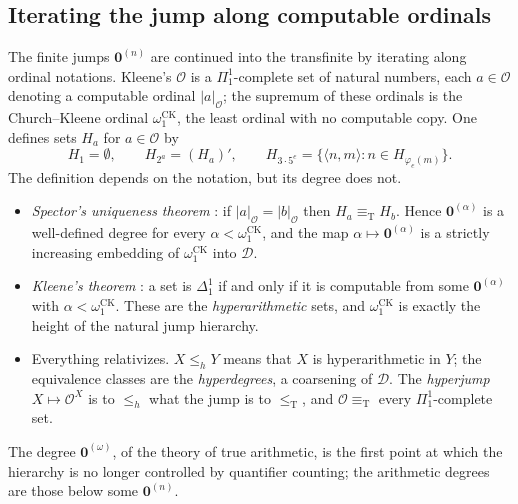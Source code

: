 \documentclass[11pt,a4paper]{article}
\newcommand{\D}{\mathcal D}
\newcommand{\leT}{\leq_{\mathrm T}}
\newcommand{\eqT}{\equiv_{\mathrm T}}
\newcommand{\zero}{\mathbf0}
\newcommand{\pair}[2]{\langle#1,#2\rangle}
\theoremstyle{definition}\newtheorem{definition}[theorem]{Definition}
\theoremstyle{remark}\newtheorem{remark}[theorem]{Remark}
\begin{document}
\subsection{Iterating the jump along computable ordinals}
\label{sec:ordinals-hyp}
The finite jumps $\zero^{(n)}$ are continued into the transfinite by iterating along ordinal notations. Kleene's $\mathcal O$ is a $\Pi^1_1$-complete set of natural numbers, each $a\in\mathcal O$ denoting a computable ordinal $|a|_{\mathcal O}$; the supremum of these ordinals is the Church--Kleene ordinal $\omega_1^{\mathrm{CK}}$, the least ordinal with no computable copy. One defines sets $H_a$ for $a\in\mathcal O$ by
\[
 H_1=\emptyset,\qquad H_{2^a}=(H_a)',\qquad
 H_{3\cdot5^e}=\{\pair{n}{m}:n\in H_{\varphi_e(m)}\}.
\]
The definition depends on the notation, but its degree does not.
\begin{itemize}
\item \emph{Spector's uniqueness theorem} \cite{Spector}: if $|a|_{\mathcal O}=|b|_{\mathcal O}$ then $H_a\eqT H_b$. Hence $\zero^{(\alpha)}$ is a well-defined degree for every $\alpha<\omega_1^{\mathrm{CK}}$, and the map $\alpha\mapsto\zero^{(\alpha)}$ is a strictly increasing embedding of $\omega_1^{\mathrm{CK}}$ into $\D$.
\item \emph{Kleene's theorem} \cite{Kleene}: a set is $\Delta^1_1$ if and only if it is computable from some $\zero^{(\alpha)}$ with $\alpha<\omega_1^{\mathrm{CK}}$. These are the \emph{hyperarithmetic} sets, and $\omega_1^{\mathrm{CK}}$ is exactly the height of the natural jump hierarchy.
\item Everything relativizes. $X\le_h Y$ means that $X$ is hyperarithmetic in $Y$; the equivalence classes are the \emph{hyperdegrees}, a coarsening of $\D$. The \emph{hyperjump} $X\mapsto\mathcal O^X$ is to $\le_h$ what the jump is to $\leT$, and $\mathcal O\eqT$ every $\Pi^1_1$-complete set.
\end{itemize}
The degree $\zero^{(\omega)}$, of the theory of true arithmetic, is the first point at which the hierarchy is no longer controlled by quantifier counting; the arithmetic degrees are those below some $\zero^{(n)}$.
\end{document}
